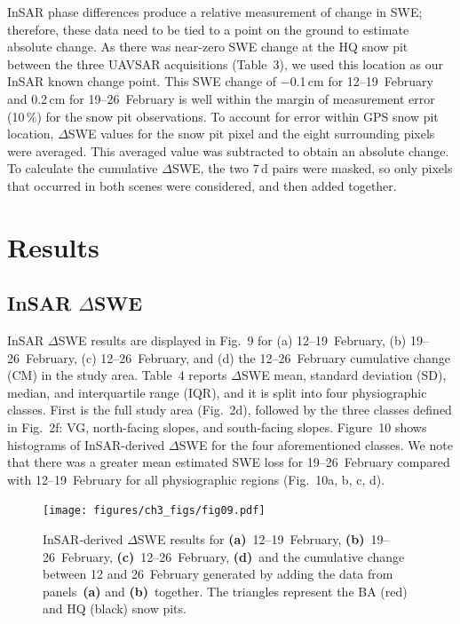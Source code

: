 InSAR phase differences produce a relative measurement of change in SWE; therefore, these data need to be tied to a point on the ground to estimate absolute change. As there was near-zero SWE change at the HQ snow pit between the three UAVSAR acquisitions (Table~3), we used this location as our InSAR known change point. This SWE change of $-0$.1\,cm for 12--19~February and 0.2\,cm for 19--26~February is well within the margin of measurement error (10\,\%) for the snow pit observations. To account for error within GPS snow pit location, $\Delta$SWE values for the snow pit pixel and the eight surrounding pixels were averaged. This averaged value was subtracted to obtain an absolute change. To calculate the cumulative $\Delta$SWE, the two 7\,d pairs were masked, so only pixels that occurred in both scenes were considered, and then added together.

\hypertarget{ch3-results}{\section{Results}\label{ch3-results}}
\hypertarget{ch3-results-1}{\subsection{InSAR $\Delta$SWE}\label{ch3-results-1}}


InSAR $\Delta$SWE results are displayed in Fig.~9 for (a) 12--19~February, (b) 19--26~February, (c) 12--26~February, and (d) the 12--26~February cumulative change (CM) in the study area. Table~4 reports $\Delta$SWE mean, standard deviation (SD), median, and interquartile range (IQR), and it is split into four physiographic classes. First is the full study area (Fig.~2d), followed by the three classes defined in Fig.~2f: VG, north-facing slopes, and south-facing slopes. Figure~10 shows histograms of InSAR-derived $\Delta$SWE for the four aforementioned classes. We note that there was a greater mean estimated SWE loss for 19--26~February compared with 12--19~February for all physiographic regions (Fig.~10a, b, c, d).

\begin{figure}[t]
\centering
\texttt{[image: figures/ch3\_figs/fig09.pdf]}
\caption{InSAR-derived $\Delta$SWE results for \textbf{(a)}~12--19~February, \textbf{(b)}~19--26~February, \textbf{(c)}~12--26~February, \textbf{(d)}~and the cumulative change between 12 and 26~February generated by adding the data from panels~\textbf{(a)} and \textbf{(b)}~together. The triangles represent the BA (red) and HQ (black) snow pits.}
\end{figure}

